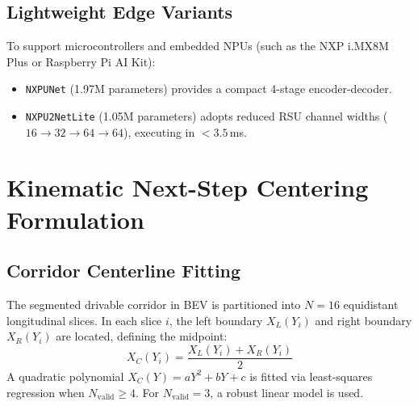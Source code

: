 \documentclass[10pt,journal,compsoc]{IEEEtran}
\begin{document}
\subsection{Lightweight Edge Variants}
To support microcontrollers and embedded NPUs (such as the NXP i.MX8M Plus or Raspberry Pi AI Kit):
\begin{itemize}
    \item \texttt{NXPUNet} (1.97M parameters) provides a compact 4-stage encoder-decoder.
    \item \texttt{NXPU2NetLite} (1.05M parameters) adopts reduced RSU channel widths ($16 \to 32 \to 64 \to 64$), executing in $< 3.5$\,ms.
\end{itemize}

\section{Kinematic Next-Step Centering Formulation}

\subsection{Corridor Centerline Fitting}
The segmented drivable corridor in BEV is partitioned into $N = 16$ equidistant longitudinal slices. In each slice $i$, the left boundary $X_L(Y_i)$ and right boundary $X_R(Y_i)$ are located, defining the midpoint:
\begin{equation}
X_C(Y_i) = \frac{X_L(Y_i) + X_R(Y_i)}{2}
\end{equation}
A quadratic polynomial $X_C(Y) = a Y^2 + b Y + c$ is fitted via least-squares regression when $N_{\text{valid}} \ge 4$. For $N_{\text{valid}} = 3$, a robust linear model is used.
\end{document}
